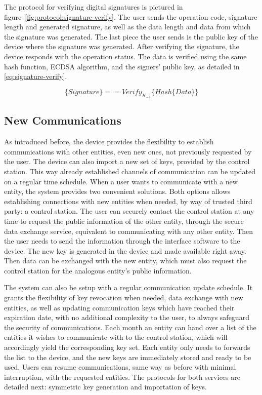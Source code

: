 The protocol for verifying digital signatures is pictured in figure~\ref{fig:protocol:signature-verify}.
The user sends the operation code, signature length and generated signature, as well as the data length and data from which the signature was generated. The last piece the user sends is the public key of the device where the signature was generated.
After verifying the signature, the device responds with the operation status.
The data is verified using the same hash function, \ac{ECDSA} algorithm, and the signers' public key, as detailed in \ref{eq:signature-verify}.

\begin{equation}
	\label{eq:signature-verify}
	\{Signature\} == Verify_{K_{-1}}\{Hash\{Data\}\}
\end{equation}

\subsection{New Communications}\label{chap:arch:services:new-comms}

As introduced before, the device provides the flexibility to establish communications with other entities, even new ones, not previously requested by the user.
The device can also import a new set of keys, provided by the control station.
This way already established channels of communication can be updated on a regular time schedule.
When a user wants to communicate with a new entity, the system provides two convenient solutions.
Both options allows establishing connections with new entities when needed, by way of trusted third party: a control station. 
The user can securely contact the control station at any time to request the public information of the other entity, through the secure data exchange service, equivalent to communicating with any other entity.
Then the user needs to send the information through the interface software to the device. The new key is generated in the device and made available right away. Then data can be exchanged with the new entity, which must also request the control station for the analogous entity's public information.

The system can also be setup with a regular communication update schedule. It grants the flexibility of key revocation when needed, data exchange with new entities, as well as updating communication keys which have reached their expiration date, with no additional complexity to the user, to always safeguard the security of communications.
Each month an entity can hand over a list of the entities it wishes to communicate with to the control station, which will accordingly yield the corresponding key set.
Each entity only needs to forwards the list to the device, and the new keys are immediately stored and ready to be used.
Users can resume communications, same way as before with minimal interruption, with the requested entities.
The protocols for both services are detailed next: symmetric key generation and importation of keys.
